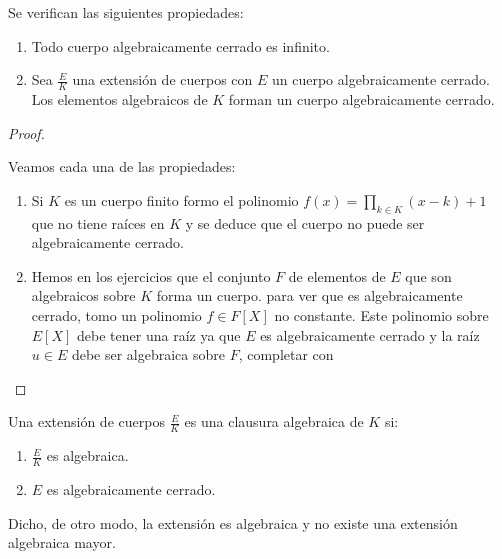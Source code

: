 \begin{proposition}
Se verifican las siguientes propiedades:

\begin{enumerate}
\item Todo cuerpo algebraicamente cerrado es infinito. 
\item Sea $\frac{E}{K}$ una extensión de cuerpos con $E$ un cuerpo algebraicamente cerrado. Los elementos algebraicos de $K$ forman un cuerpo algebraicamente cerrado. 
\end{enumerate}
\end{proposition}
\begin{proof}
\begin{enumerate}
Veamos cada una de las propiedades:

\begin{enumerate}
\item Si $K$ es un cuerpo finito formo el polinomio $f(x) = \prod_{k \in K} (x-k) + 1$ que no tiene raíces en $K$ y se deduce que el cuerpo no puede ser algebraicamente cerrado. 
\item Hemos en los ejercicios que el conjunto $F$ de elementos de $E$ que son algebraicos sobre $K$ forma un cuerpo. para ver que es algebraicamente cerrado, tomo un polinomio $f \in F[X]$ no constante. Este polinomio sobre $E[X]$ debe tener una raíz ya que $E$ es algebraicamente cerrado y la raíz $u \in E$ debe ser algebraica sobre $F$, completar con \cite{link4}
\end{enumerate}
\end{enumerate}

\end{proof}

\begin{definition}
Una extensión de cuerpos $\frac{E}{K}$ es una clausura algebraica de $K$ si:

\begin{enumerate}
\item $\frac{E}{K}$ es algebraica. 
\item $E$ es algebraicamente cerrado. 
\end{enumerate}

Dicho, de otro modo, la extensión es algebraica y no existe una extensión algebraica mayor. 
\end{definition}

